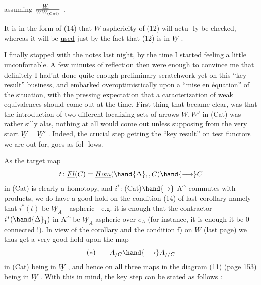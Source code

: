 assuming $\underline{W} = \over{W}{W}_{(Cat)}$ .

It is in the form of (14) that  $\underline{W}$-asphericity of (12) will actu-%
ly be checked, whereas it will be \uline{used} just by the fact that (12) is in
$\underline{W}$ .


 I finally stopped with the notes last night,  by the time  I
started feeling a little unconfortable. A few minutes of reflection then
were enough to convince me that definitely I had'nt done quite enough
preliminary scratchwork yet on this ``key result'' business, and embarked
overoptimistically upon a ``mise en équation'' of the situation, with the
pressing expectation that a caracterization of weak equivalences should
come out at the  time. First thing that became clear, was that
the introduction of two different localizing sets of arrows $\underline{W},\underline{W}'$ in (Cat)
was rather silly alas, nothing at all would come out unless supposing
from the very start $\underline{W} = \underline{W}'$ . Indeed, the crucial step  
getting the ``key result'' on test functors we are out for, goes as fol-%
lows.

As the target map
\[ t\colon \underline{Fl}(C) = \underline{Hom}(\hand{\Delta}_1,C) \hand{\longrightarrow} C \]
in (Cat) is clearly a homotopy, and $i^*$: (Cat)$\hand{\to}$ A\^{} commutes with
products, we do have a good hold on the condition (14) of last corollary\hand{,}
namely that $i^*(t)$ be $\underline{W}_A$ - aspheric - e.g. it is enough that the
contractor $i^*(\hand{\Delta}_1)$ in A\^{} be $\underline{W}_A$-aspheric over $e_{A\hat{}}$ (for instance, it is 
enough it be 0-connected !). In view of the corollary and the condition
f) on $\underline{W}$ (last page)\hand{,} we thus get a very good hold upon the  map
\[ (*) \qquad A_{/C} \hand{\longrightarrow} A_{//C} \]
in (Cat) being in $\underline{W}$ , and hence on all three maps in the diagram (11)
(page 153) being in $\underline{W}$ . With this in mind, the key step can be stated
as follows :

